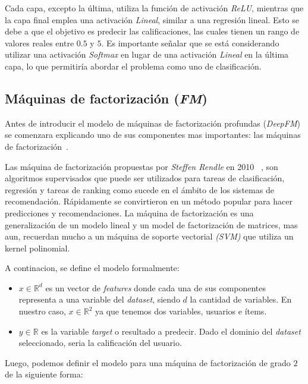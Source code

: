 \documentclass[11pt,a4paper,twoside]{thesis}
\begin{document}
Cada capa, excepto la última, utiliza la función de activación \textit{ReLU},
mientras que la capa final emplea una activación \textit{Lineal}, similar a una
regresión lineal. Esto se debe a que el objetivo es predecir las
calificaciones, las cuales tienen un rango de valores reales entre $0.5$ y $5$.
Es importante señalar que se está considerando utilizar una activación
\textit{Softmax} en lugar de una activación \textit{Lineal} en la última capa,
lo que permitiría abordar el problema como uno de clasificación.

\clearpage

\subsection{Máquinas de factorización (\textit{FM})}

Antes de introducir el modelo de máquinas de factorización profundas
(\textit{DeepFM}) se comenzara explicando uno de sus componentes mas
importantes: las máquinas de factorización~\cite{didlfm, zhangdive}.

Las máquina de factorización propuestas por \textit{Steffen Rendle} en 2010
~\cite{fm}, son algoritmos supervisados que puede ser utilizados para tareas de
clasificación, regresión y tareas de ranking como sucede en el ámbito de los
sistemas de recomendación. Rápidamente se convirtieron en un método popular
para hacer predicciones y recomendaciones. La máquina de factorización es una
generalización de un modelo lineal y un model de factorización de matrices, mas
aun, recuerdan mucho a un máquina de soporte vectorial \textit{(SVM)} que
utiliza un kernel polinomial.

A continacion, se define el modelo formalmente:

\begin{itemize}
	\item $x\in\mathbb{R}^{d}$ es un vector de \textit{features} donde cada una de
	      sus componentes representa a una variable del \textit{dataset}, siendo $d$
	      la cantidad de variables. En nuestro caso,
	      $x\in\mathbb{R}^{2}$ ya que tenemos dos variables, usuarios e ítems.
	\item $y\in\mathbb{R}$ es la variable \textit{target} o resultado a predecir.
	      Dado el dominio del \textit{dataset} seleccionado, seria la
	      calificación del usuario.
\end{itemize}

Luego, podemos definir el modelo para una máquina de factorización de grado $2$
de la siguiente forma:
\end{document}
